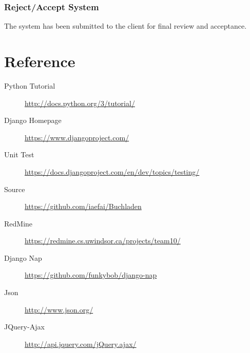 \documentclass[11pt]{article}
\begin{document}
		\subsubsection{Reject/Accept System}
			The system has been submitted to the client for final review and acceptance.
\section{Reference}
\label{sec-reference}

\begin{description}
\item[Python Tutorial] \href{http://docs.python.org/3/tutorial/}{http://docs.python.org/3/tutorial/}
\item[Django Homepage] \href{https://www.djangoproject.com/}{https://www.djangoproject.com/}
\item[Unit Test] \href{https://docs.djangoproject.com/en/dev/topics/testing/}{https://docs.djangoproject.com/en/dev/topics/testing/}
\item[Source] \href{https://github.com/iaefai/Buchladen}{https://github.com/iaefai/Buchladen}
\item[RedMine]
  \href{https://redmine.cs.uwindsor.ca/projects/team10/}{https://redmine.cs.uwindsor.ca/projects/team10/}
\item[Django Nap] \href{https://github.com/funkybob/django-nap}{https://github.com/funkybob/django-nap}
\item[Json] \href{http://www.json.org/}{http://www.json.org/}
\item[JQuery-Ajax] \href{http://api.jquery.com/jQuery.ajax/}{http://api.jquery.com/jQuery.ajax/}
\end{description}
\end{document}
